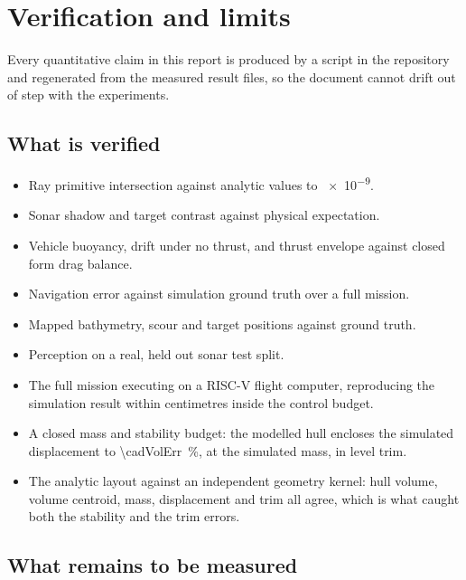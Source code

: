 \documentclass[10pt,a4paper]{article}
\begin{document}
\section{Verification and limits}

Every quantitative claim in this report is produced by a script in the
repository and regenerated from the measured result files, so the document
cannot drift out of step with the experiments.

\subsection{What is verified}

\begin{itemize}[leftmargin=*,itemsep=2pt]
\item Ray primitive intersection against analytic values to \num{e-9}.
\item Sonar shadow and target contrast against physical expectation.
\item Vehicle buoyancy, drift under no thrust, and thrust envelope against
closed form drag balance.
\item Navigation error against simulation ground truth over a full mission.
\item Mapped bathymetry, scour and target positions against ground truth.
\item Perception on a real, held out sonar test split.
\item The full mission executing on a RISC-V flight computer, reproducing the
simulation result within centimetres inside the control budget.
\item A closed mass and stability budget: the modelled hull encloses the
simulated displacement to \SI{\cadVolErr}{\percent}, at the simulated mass, in
level trim.
\item The analytic layout against an independent geometry kernel: hull volume,
volume centroid, mass, displacement and trim all agree, which is what caught
both the stability and the trim errors.
\end{itemize}

\subsection{What remains to be measured}
\end{document}
